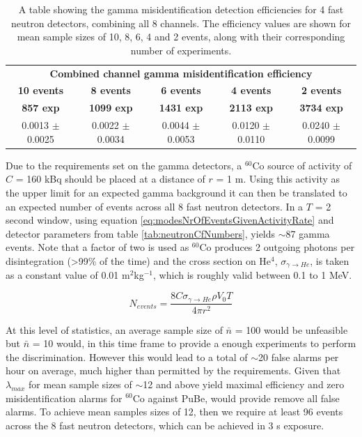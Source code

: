 \begin{table}[h]
\centering
	\begin{tabular}{ccccc}
	\hline
	\hline
	\multicolumn{5}{c}{\textbf{Combined channel gamma misidentification efficiency}} \\
	\small{\textbf{10 events}} & \small{\textbf{8 events}} & \small{\textbf{6 events}} & \small{\textbf{4 events}}& \small{\textbf{2 events}}\\
        \small{\textbf{857 exp}} & \small{\textbf{1099 exp}} & \small{\textbf{1431 exp}} & \small{\textbf{2113 exp}}& \small{\textbf{3734 exp}}\\
	\hline
	 \small{0.0013 $\pm$ 0.0025} & \small{0.0022 $\pm$ 0.0034} & \small{0.0044 $\pm$ 0.0053} & \small{0.0120 $\pm$ 0.0110} & \small{0.0240 $\pm$ 0.0099}\\ 
	\hline
	\hline
\end{tabular}
\caption{A table showing the gamma misidentification detection efficiencies for 4 fast neutron detectors, combining all 8 channels. The efficiency values are shown for mean sample sizes of 10, 8, 6, 4 and 2 events, along with their corresponding number of experiments.}
\label{tab:modesPSDAllChannelsBestEffValuesEventSamplesGammas}
\end{table}

Due to the requirements set on the gamma detectors, a $^{60}$Co source of activity of $C$ = 160 kBq should be placed at a distance of $r$ = 1 m. Using this activity as the upper limit for an expected gamma background it can then be translated to an expected number of events across all 8 fast neutron detectors. In a $T$ = 2 second window, using equation \ref{eq:modesNrOfEventsGivenActivityRate} and detector parameters from table \ref{tab:neutronCfNumbers}, yields $\sim$87 gamma events. Note that a factor of two is used as $^{60}$Co produces 2 outgoing photons per disintegration (>99\% of the time) and the cross section on He$^{4}$, $\sigma_{\gamma \rightarrow He}$, is taken as a constant value of 0.01 m$^{2}$kg$^{-1}$, which is roughly valid between 0.1 to 1 MeV.

\begin{equation}
	N_{events} = \frac{8C\sigma_{\gamma \rightarrow He} \rho V_{0}T}{4\pi r^{2}}
	\label{eq:modesNrOfEventsGivenActivityRate}
\end{equation}

At this level of statistics, an average sample size of $\bar{n}$ = 100 would be unfeasible but $\bar{n}$ = 10 would, in this time frame to provide a enough experiments to perform the discrimination. However this would lead to a total of $\sim$20 false alarms per hour on average, much higher than permitted by the requirements. Given that $\lambda_{max}$ for mean sample sizes of $\sim$12 and above yield maximal efficiency and zero misidentification alarms for $^{60}$Co against PuBe, would provide remove all false alarms. To achieve mean samples sizes of 12, then we require at least 96 events across the 8 fast neutron detectors, which can be achieved in 3 s exposure.

